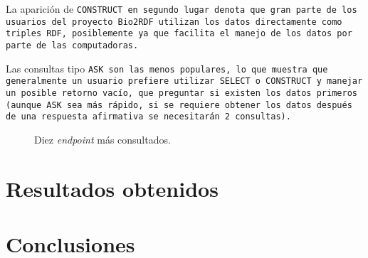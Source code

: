 La aparición de \tt{CONSTRUCT} en segundo lugar denota que gran parte de los
usuarios del proyecto Bio2RDF utilizan los datos directamente como  triples RDF,
posiblemente ya que facilita el manejo de los datos por parte de las
computadoras.

Las consultas tipo \tt{ASK} son las menos populares, lo que muestra que
generalmente un usuario prefiere utilizar \tt{SELECT} o \tt{CONSTRUCT} y manejar
un posible retorno vacío, que preguntar si existen los datos primeros (aunque
\tt{ASK} sea más rápido, si se requiere obtener los datos después de una
respuesta afirmativa se necesitarán 2 consultas).


\begin{figure}[ht]
  \caption{Diez \emph{endpoint} más consultados.}\label{fig:t10endp}
\end{figure}


\section{Resultados obtenidos}\label{sec:res}
\section{Conclusiones}\label{sec:con}
